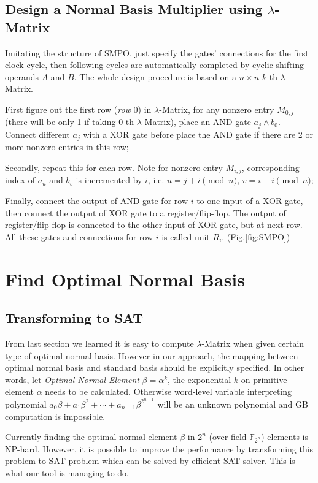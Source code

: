 \documentclass{acm_proc_article-sp}
\begin{document}
\subsection{Design a Normal Basis Multiplier using $\lambda$-Matrix}
Imitating the structure of SMPO, just specify the gates' connections for the first clock cycle, then following cycles are
automatically completed by cyclic shifting operands $A$ and $B$. The whole design procedure is based on a $n \times n$ $k$-th $\lambda$-Matrix.

First figure out the first row (\emph{row} 0) in $\lambda$-Matrix, for any nonzero entry $M_{0,j}$ (there will be only 1 if taking $0$-th $\lambda$-Matrix), place an AND gate
$a_j\land b_0$. Connect different $a_j$ with a XOR gate before place the AND gate if there are 2 or more nonzero entries in this row;

Secondly, repeat this for each row. Note for nonzero entry $M_{i,j}$, corresponding index of $a_u$ and $b_v$ is incremented by $i$, i.e. $u = j + i \pmod n$, $v = i + i \pmod n$;

Finally, connect the output of AND gate for row $i$ to one input of a XOR gate, then connect the output of XOR gate to a register/flip-flop. The output of register/flip-flop is connected
to the other input of XOR gate, but at next row. All these gates and connections for row $i$ is called unit $R_i$. (Fig.\ref{fig:SMPO})

\section{Find Optimal Normal Basis}
\subsection{Transforming to SAT}
From last section we learned it is easy to compute $\lambda$-Matrix when given certain type of optimal normal basis. However in our approach, the mapping between 
optimal normal basis and standard basis should be explicitly specified. In other words, let \emph{Optimal Normal Element} $\beta = \alpha^k$, the exponential $k$ on
primitive element $\alpha$ needs to be calculated. Otherwise word-level variable interpreting polynomial $a_0\beta + a_1\beta^2 + \cdots + a_{n-1}\beta^{2^{n-1}}$
will be an unknown polynomial and GB computation is impossible.

Currently finding the optimal normal element $\beta$ in $2^n$ (over field $\mathbb{F}_{2^n}$) elements is NP-hard. However, it is possible to improve the performance 
by transforming this problem to SAT problem which can be solved by efficient SAT solver. This is what our tool is managing to do.
\end{document}
